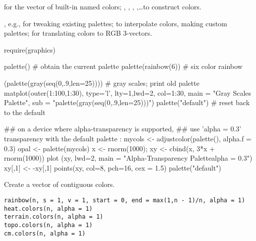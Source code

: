 %
\begin{SeeAlso}\relax
{} for the vector of built-in named colors;
, , ,
,\dots to construct colors.

, e.g., for tweaking existing palettes;
 to interpolate colors, making custom palettes;
 for translating colors to RGB 3-vectors.
\end{SeeAlso}
%
\begin{Examples}
\begin{ExampleCode}
require(graphics)

palette()               # obtain the current palette
palette(rainbow(6))     # six color rainbow

(palette(gray(seq(0,.9,len=25)))) # gray scales; print old palette
matplot(outer(1:100,1:30), type='l', lty=1,lwd=2, col=1:30,
        main = "Gray Scales Palette",
        sub = "palette(gray(seq(0,.9,len=25)))")
palette("default")      # reset back to the default

## on a device where alpha-transparency is supported,
##  use 'alpha = 0.3' transparency with the default palette :
mycols <- adjustcolor(palette(), alpha.f = 0.3)
opal <- palette(mycols)
x <- rnorm(1000); xy <- cbind(x, 3*x + rnorm(1000))
plot (xy, lwd=2,
       main = "Alpha-Transparency Palette\n alpha = 0.3")
xy[,1] <- -xy[,1]
points(xy, col=8, pch=16, cex = 1.5)
palette("default")
\end{ExampleCode}
\end{Examples}
%
\begin{Description}\relax
Create a vector of  contiguous colors.
\end{Description}
%
\begin{Usage}
\begin{verbatim}
rainbow(n, s = 1, v = 1, start = 0, end = max(1,n - 1)/n, alpha = 1)
heat.colors(n, alpha = 1)
terrain.colors(n, alpha = 1)
topo.colors(n, alpha = 1)
cm.colors(n, alpha = 1)
\end{verbatim}
\end{Usage}
